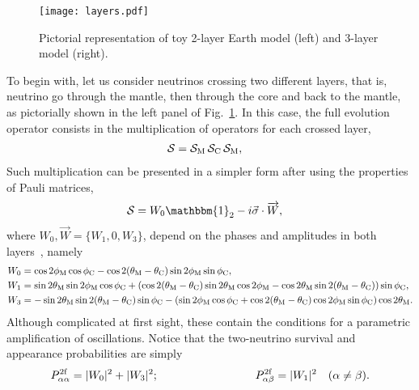 \begin{figure}[t]
\begin{center}
\texttt{[image: layers.pdf]}
\caption{Pictorial representation of toy 2-layer Earth model (left) and 3-layer model (right). \label{fig:layers}} 
\end{center}
\end{figure}
To begin with, let us consider neutrinos crossing two different layers, that is, neutrino go through the mantle, then through the core and back to the mantle, as pictorially shown in the left panel of Fig.~\ref{fig:layers}. 
In this case, the full evolution operator consists in the multiplication of operators for each crossed layer,
\begin{align*}
	{\cal S} &= {\cal S}_{\rm M}\,{\cal S}_{\rm C}\,{\cal S}_{\rm M},
\end{align*}
Such multiplication can be presented in a simpler form after using the properties of Pauli matrices,
\begin{align}
	{\cal S} & = W_0 \mathbbm{1}_2 - i \vec{\sigma}\cdot\overrightarrow{W},
\end{align}
where $W_0, \overrightarrow{W}=\{W_1,0,W_3\}$, depend on the phases and amplitudes in both layers~\cite{Akhmedov:1998ui,Akhmedov:1998xq,Chizhov:1998ug,Chizhov:1999az,Chizhov:1999he}, namely
\begin{subequations}
\begin{align}
 W_0 &= \cos 2\phi_{\rm M}\cos \phi_{\rm C} -\cos 2(\theta_{\rm M}-\theta_{\rm C}) \sin 2\phi_{\rm M}\sin \phi_{\rm C},\\
 W_1 &=  \sin 2 \theta_{\rm M}\sin 2\phi_{\rm M}\cos \phi_{\rm C} +(\cos 2(\theta_{\rm M}-\theta_{\rm C}) \sin 2\theta_{\rm M}\cos 2\phi_{\rm M}- \cos2\theta_{\rm M}\sin 2(\theta_{\rm M}-\theta_{\rm C}))\sin \phi_{\rm C},\\
 W_3 & = -\sin 2 \theta_{\rm M}\sin 2(\theta_{\rm M}-\theta_{\rm C}) \sin\phi_{\rm C} - (\sin2\phi_{\rm M}\cos\phi_{\rm C}+\cos 2(\theta_{\rm M}-\theta_{\rm C}) \cos 2 \phi_{\rm M}  \sin\phi_{\rm C})\cos 2\theta_{\rm M}.
 \end{align}
\end{subequations}
Although complicated at first sight, these contain the conditions for a parametric amplification of oscillations. 
Notice that the two-neutrino survival and appearance probabilities are simply
\begin{align}
	P_{\alpha\alpha}^{\rm 2f} = |W_0|^2+|W_3|^2; \hspace{3cm}
  	P_{\alpha\beta}^{\rm 2f}  = |W_1|^2\quad (\alpha\neq\beta).
\end{align}

